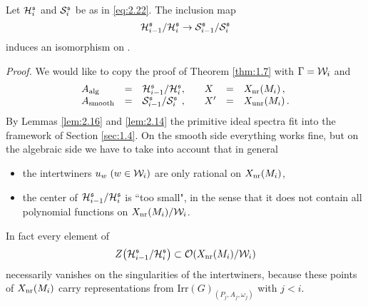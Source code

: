 \begin{prop}\label{prop:3.8}
Let $\mathcal H_i^{\mathfrak s}$ and $\mathcal S_i^{\mathfrak s}$ be as in \eqref{eq:2.22}. The inclusion map
\[
\mathcal H_{i-1}^{\mathfrak s} / \mathcal H_i^{\mathfrak s} \to \mathcal S_{i-1}^{\mathfrak s} / \mathcal S_i^{\mathfrak s}
\]
induces an isomorphism on \pch \!.
\end{prop}
\emph{Proof.}
We would like to copy the proof of Theorem \ref{thm:1.7} with $\Gamma = \mathcal W_i$ and
\[
\begin{array}{lll@{,\qquad}lll}
A\al & = & \mc H^{\mf s}_{i-1} / \mc H^{\mf s}_i & X & = & \xnr  (M_i ) \,, \\
A\sm & = & \mc S^{\mf s}_{i-1} / \mc S^{\mf s}_i & X' & = & \xunr  (M_i ) \,.
\end{array}
\]
By Lemmas \ref{lem:2.16} and \ref{lem:2.14} the primitive ideal spectra fit into the framework
of Section \ref{sec:1.4}. On the smooth side everything works fine, but on the algebraic
side we have to take into account that in general
\begin{itemize}
\item the intertwiners $u_w \; (w \in \mathcal W_i )$ are only rational on $X_{\mathrm{nr}} (M_i )$,
\item the center of $\mathcal H^{\mathfrak s}_{i-1} / \mathcal H^{\mathfrak s}_i$ is ``too small", in the sense that
it does not contain all polynomial functions on $X_{\mathrm{nr}} (M_i ) / \mathcal W_i$.
\end{itemize}
In fact every element of 
\[
Z \big( \mathcal H^{\mathfrak s}_{i-1} / \mathcal H^{\mathfrak s}_i \big) \subset \mathcal O (X_{\mathrm{nr}} (M_i ) / \mathcal W_i )
\]
necessarily vanishes on the singularities of the intertwiners, because these points of 
$X_{\mathrm{nr}} (M_i )$ carry representations from Irr$ (G )_{(P_j ,A_j ,\omega_j )}$ with $j < i$.

